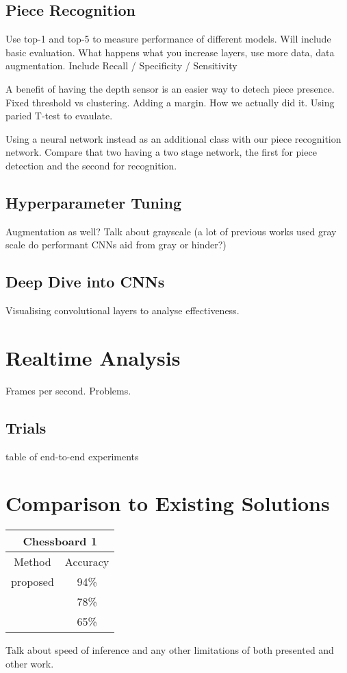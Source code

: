 \subsection{Piece Recognition}
Use top-1 and top-5 to measure performance of different models.
Will include basic evaluation.  What happens what you increase layers, use more data, data augmentation.
Include Recall / Specificity / Sensitivity

A benefit of having the depth sensor is an easier way to detech piece presence.  
Fixed threshold vs clustering.  Adding a margin.  How we actually did it.
Using paried T-test to evaulate.

Using a neural network instead as an additional class with our piece recognition network.
Compare that two having a two stage network, the first for piece detection and the second for recognition.


\subsection{Hyperparameter Tuning}
Augmentation as well?
Talk about grayscale (a lot of previous works used gray scale do performant CNNs aid from gray or hinder?)

\subsection{Deep Dive into CNNs}
Visualising convolutional layers to analyse effectiveness.

\section{Realtime Analysis}
Frames per second.  Problems.

\subsection{Trials}
table of end-to-end experiments

\section{Comparison to Existing Solutions}
\begin{center}
\begin{tabular}{|c|c|}
    \multicolumn{2}{c}{Chessboard 1} \\
    \hline
    Method & Accuracy \\
    \hline
    proposed & 94\% \\
    \cite{} & 78\% \\
    \cite{} & 65\%  \\
    \hline
\end{tabular}
\end{center}

Talk about speed of inference and any other limitations of both presented and other work.